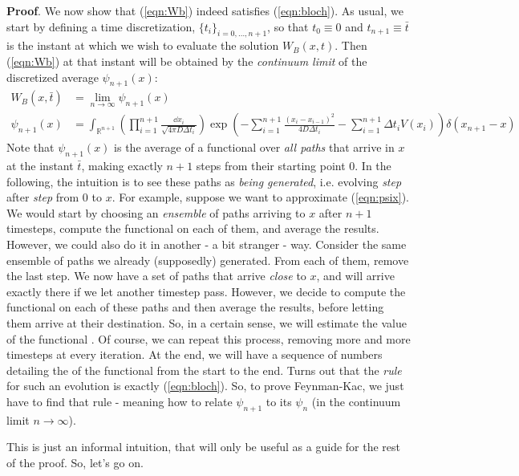 \documentclass[../template.tex]{subfiles}
\begin{document}
\medskip

\textbf{Proof}. We now show that (\ref{eqn:Wb}) indeed satisfies (\ref{eqn:bloch}). As usual, we start by defining a time discretization, $\{t_i\}_{i=0,\dots,n+1}$, so that $t_0 \equiv 0$ and $t_{n+1} \equiv \bar{t}$ is the instant at which we wish to evaluate the solution $W_B(x,t)$. Then (\ref{eqn:Wb}) at that instant will be obtained by the \textit{continuum limit} of the discretized average $\psi_{n+1}(x)$:
\begin{align}
    W_B(x, \bar{t}) &= \lim_{n \to \infty} \psi_{n+1}(x) \nonumber\\
    \psi_{n+1}(x) &= \int_{\mathbb{R}^{n+1}} \left(\prod_{i=1}^{n+1} \frac{\dd{x_i}}{\sqrt{4 \pi D \Delta t_i} }\right) \exp\left(-\sum_{i=1}^{n+1} \frac{(x_i - x_{i-1})^2}{4 D \Delta t_i} - \sum_{i=1}^{n+1} \Delta t_i V(x_i)\right) \delta(x_{n+1}-x)
     \label{eqn:psix}
\end{align} 
Note that $\psi_{n+1}(x)$ is the average of a functional over \textit{all paths} that arrive in $x$ at the instant $\bar{t}$, making exactly $n+1$ steps from their starting point $0$. In the following, the intuition is to see these paths as \textit{being generated}, i.e. evolving \textit{step} after \textit{step} from $0$ to $x$. For example, suppose we want to approximate (\ref{eqn:psix}). We would start by choosing an \textit{ensemble} of paths arriving to $x$ after $n+1$ timesteps, compute the functional on each of them, and average the results.
However, we could also do it in another  - a bit stranger - way. Consider the same ensemble of paths we already (supposedly) generated. From each of them, remove the last step. We now have a set of paths that arrive \textit{close} to $x$, and will arrive exactly there if we let another timestep pass. However, we decide to compute the functional on each of these paths and then average the results, before letting them arrive at their destination. So, in a certain sense, we will estimate the value of the functional . Of course, we can repeat this process, removing more and more timesteps at every iteration. At the end, we will have a sequence of numbers detailing the  of the functional from the start to the end. Turns out that the \textit{rule} for such an evolution is exactly (\ref{eqn:bloch}). So, to prove Feynman-Kac, we just have to find that rule - meaning how to relate $\psi_{n+1}$ to its  $\psi_n$ (in the continuum limit $n \to\infty$).

This is just an informal intuition, that will only be useful as a guide for the rest of the proof. So, let's go on.
\end{document}
